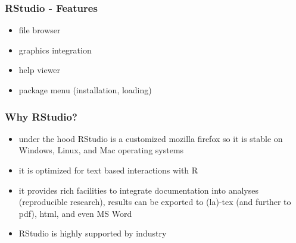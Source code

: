 \documentclass[xcolor={table}]{beamer}
\begin{document}
\begin{frame}\frametitle{RStudio - Features}
  \begin{itemize}
    \item file browser
    \item graphics integration
    \item help viewer
    \item package menu (installation, loading)
  \end{itemize}
\begin{center}
\end{center}
\end{frame}


\begin{frame}\frametitle{Why RStudio?}
\begin{itemize}
\item under the hood RStudio is a customized mozilla firefox so it is stable on Windows, Linux, and Mac operating systems
\item it is optimized for text based interactions with R
\item it provides rich facilities to integrate documentation into analyses (reproducible research), results can be exported to (la)-tex (and further to pdf), html, and even MS Word
\item RStudio is highly supported by industry
  \end{itemize}
\end{frame}
\end{document}
